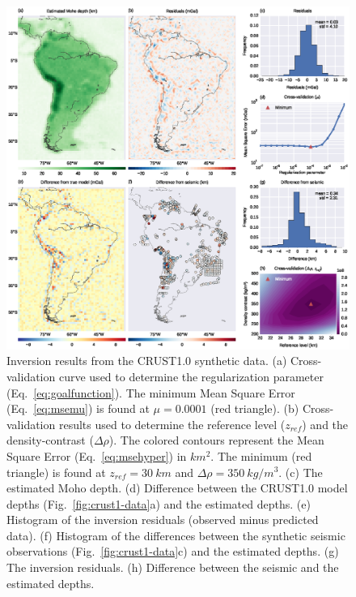 \documentclass[extra,mreferee]{gji}
\begin{document}
\begin{figure}
    \centering
    \includegraphics[width=\textwidth]{figures/synthetic-crust1-results}
    \caption{
        Inversion results from the CRUST1.0 synthetic data.
        (a) Cross-validation curve used to determine
        the regularization parameter (Eq.~\ref{eq:goalfunction}).
        The minimum Mean Square Error (Eq.~\ref{eq:msemu}) is found at
        $\mu = 0.0001$ (red triangle).
        (b) Cross-validation results used to determine
        the reference level ($z_{ref}$) and the density-contrast ($\Delta\rho$).
        The colored contours represent
        the Mean Square Error (Eq.~\ref{eq:msehyper}) in $km^2$.
        The minimum (red triangle) is found at $z_{ref} = 30\ km$
        and $\Delta\rho = 350\ kg/m^3$.
        (c) The estimated Moho depth.
        (d) Difference between the CRUST1.0 model depths
        (Fig.~\ref{fig:crust1-data}a)
        and the estimated depths.
        (e) Histogram of the inversion residuals
        (observed minus predicted data).
        (f) Histogram of the differences between
        the synthetic seismic observations (Fig.~\ref{fig:crust1-data}c)
        and the estimated depths.
        (g) The inversion residuals.
        (h) Difference between the seismic and the estimated depths.
    }
    \label{fig:crust1-results}
\end{figure}
\end{document}
